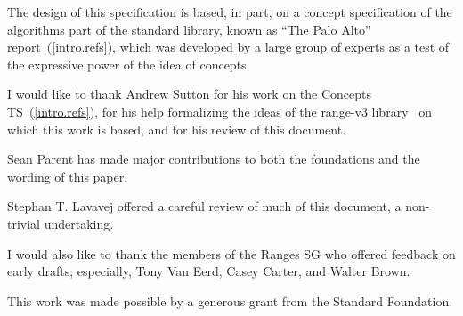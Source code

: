 \setcounter{chapter}{0}

The design of this specification is based, in part, on a concept
specification of the algorithms part of the \Cpp standard library, known
as ``The Palo Alto'' report~(\ref{intro.refs}), which was developed by a large
group of experts as a test of the expressive power of the idea of
concepts.

I would like to thank Andrew Sutton for his work on the Concepts TS~(\ref{intro.refs}),
for his help formalizing the ideas of the range-v3 library~\cite{range-v3} on which this
work is based, and for his review of this document.

Sean Parent has made major contributions to both the foundations and the wording of this
paper.

Stephan T. Lavavej offered a careful review of much of this document, a non-trivial undertaking.

I would also like to thank the members of the Ranges SG who offered feedback on early drafts;
especially, Tony Van Eerd, Casey Carter, and Walter Brown.

This work was made possible by a generous grant from the Standard \Cpp Foundation.
